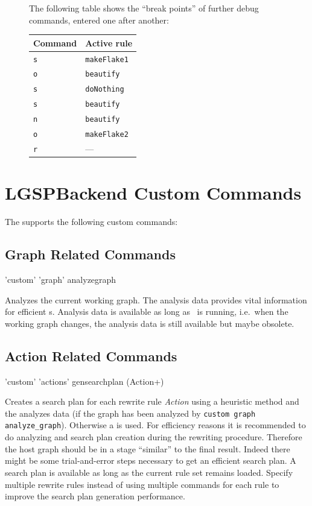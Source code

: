 \begin{figure}[htbp]
\begin{example}
\begin{center}
\end{center}
The following table shows the ``break points'' of further debug commands, entered one after another:
\begin{center}
  \begin{tabular}{|l|l|} \hline
    \textbf{Command} & \textbf{Active rule} \\ \hline
    \texttt{s} & \texttt{makeFlake1} \\
    \texttt{o} & \texttt{beautify} \\
    \texttt{s} & \texttt{doNothing} \\
    \texttt{s} & \texttt{beautify} \\ 
    \texttt{n} & \texttt{beautify} \\ 
    \texttt{o} & \texttt{makeFlake2} \\
    \texttt{r} & --- \\ \hline
  \end{tabular}
\end{center}
\end{example}   
\end{figure}


\section{LGSPBackend Custom Commands}
\label{custom}
The  supports the following custom commands:

\subsection{Graph Related Commands}
\begin{rail}
  'custom' 'graph' analyzegraph
\end{rail}
Analyzes the current working graph. The analysis data provides vital information for efficient s. Analysis data is available as long as \GrShell\ is running, i.e.\ when the working graph changes, the analysis data is still available but maybe obsolete.

\subsection{Action Related Commands}
\begin{rail}
  'custom' 'actions' gensearchplan (Action+)
\end{rail}
Creates a search plan for each rewrite rule \emph{Action} using a heuristic method and the analyzes data (if the graph has been analyzed by \texttt{custom graph analyze\_graph}). Otherwise a  is used. For efficiency reasons it is recommended to do analyzing and search plan creation during the rewriting procedure. Therefore the host graph should be in a stage ``similar'' to the final result. Indeed there might be some trial-and-error steps necessary to get an efficient search plan. A search plan is available as long as the current rule set remains loaded. 
Specify multiple rewrite rules instead of using multiple commands for each rule to improve the search plan generation performance.

